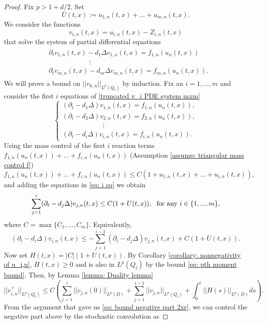 \documentclass[12pt]{article}
\theoremstyle{definition}
\theoremstyle{remark}
\begin{document}
\begin{proof}
Fix $p>1+d/2$. Set
    $$U(t,x) :=u_{1,n}(t,x)+...+u_{m,n}(t,x).$$
We consider the functions  
    $$v_{i,n}(t,x) = u_{i,n}(t,x) - Z_{i,n}(t,x)$$
    that solve the system of partial differential equations
\begin{align}\label{truncated v_i PDE system mxm}
\begin{split}
&\partial_t v_{1,n}(t,x) - d_1\Delta v_{1,n}(t,x) = f_{1,n}(u_n(t,x))\\
&\qquad\qquad\qquad\vdots\\
&\partial_t v_{m,n}(t,x) - d_m\Delta v_{m,n}(t,x) = f_{m,n}(u_n(t,x)).
\end{split}
\end{align}
We will prove a bound on $||v_{k,n}||_{L^p(Q_t)}$ by induction.
Fix an $i=1,...,m$ and consider the first $i$ equations of \eqref{truncated v_i PDE system mxm}
 \begin{equation}\label{eq: i eq}
    \begin{cases}
        (\partial_t - d_1\Delta)v_{1,n}(t,x) = f_{1,n}(u_n(t,x)),\\
        (\partial_t - d_2\Delta)v_{2,n}(t,x) = f_{2,n}(u_n(t,x)),\\
       \qquad\qquad\qquad \vdots\\
        (\partial_t - d_i\Delta)v_{i,n}(t,x) = f_{i,n}(u_n(t,x)).
    \end{cases}
    \end{equation}
Using the mass control of the first $i$ reaction terms $f_{1,n}(u_n(t,x))+...+f_{i,n}(u_n(t,x))$ (Assumption \ref{assump: triangular mass control f})
\[
f_{1,n}(u_n(t,x))+...+f_{i,n}(u_n(t,x)) \leq C(1+u_{1,n}(t,x) + ... + u_{i,n}(t,x)),
\]
and adding the equations in \eqref{eq: i eq} we obtain
    \[
    \sum_{j=1}^{i} (\partial_t -d_{j}\Delta)v_{j,n}(t,x) \leq C(1+U(t,x)), \hspace{0.1cm} \text{ for any } i\in \{1,...,m\},
    \]
    where $C=\max \{C_1,...,C_m\}$. Equivalently,
    \[
    (\partial_t - d_i\Delta )v_{i,n}(t,x) \leq -\sum_{j=1}^{i-1} (\partial_t - d_j\Delta)v_{j,n}(t,x) + C(1+U(t,x)). 
    \]
    Now set $H(t,x) = |C|(1+U(t,x))$. By Corollary \ref{corollary: nonnegativity of u_i,n}, $H(t,x)\geq 0$ and is also in $L^p(Q_t)$ by the bound \eqref{eq: pth moment bound}. Then, by Lemma \ref{lemma: Duality lemma}
    \[
    ||v_{i,n}^{+}||_{L^p(Q_t)}\leq C\left(\sum_{j=1}^{i} ||v_{j,n}(0)||_{L^p(D)}+\sum_{j=1}^{i-1} ||v_{j,n}||_{L^p(Q_t)} + \int_0^t ||H(s)||_{L^p(D)}ds\right).
    \]
   From the argument that gave us \eqref{eq: bound negative part 2xr}, we can control the negative part above by the stochastic convolution as

\end{proof}
\end{document}
